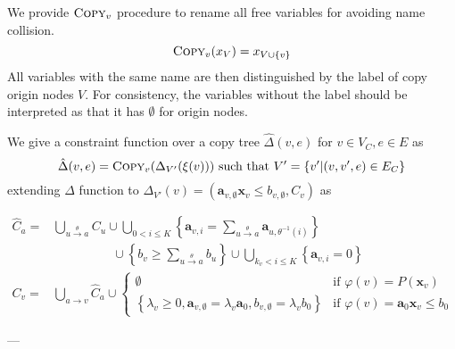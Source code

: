 \documentclass[a4paper,12pt]{article}
\newcommand{\edge}[2]{#1\rightarrow#2}
\newcommand{\edgel}[3]{#1\xrightarrow{#2}#3}
\begin{document}
We provide $\textsc{Copy}_v$ procedure to rename all free variables
for avoiding name collision.
\[ \textsc{Copy}_v (x_V) = x_{V \cup \left\lbrace v \right\rbrace} \]
All variables with the same name are then distinguished by the label
of copy origin nodes $V$. For consistency, the variables without the
label should be interpreted as that it has $\emptyset$ for origin
nodes.

We give a constraint function over a copy tree
$\hat \Delta(v,e)$ for $v \in V_C, e \in E$ as
\[ \hat \Delta (v,e) = \textsc{Copy}_v (\Delta_{V'} (\xi (v)))
\text{ such that } V' = \left\lbrace v' \middle| (v, v',e) \in E_C \right\rbrace \]
extending $\Delta$ function to
$\Delta_{V'} (v) = (\mathbf{a}_{v,\emptyset} \mathbf{x}_v \leq b_{v,\emptyset}, C_v)$
as

\begin{align*}
\hat C_a = &
 \bigcup_{\edgel{u}{\theta}{a}} C_u \cup
 \bigcup_{0 < i \leq K}
 \left\lbrace
  \mathbf{a}_{v,i} = \sum_{\edgel{u}{\theta}{a}} \mathbf{a}_{u, \theta^{-1} (i)}
 \right\rbrace \\
 & \hspace{2cm} \cup
 \left\lbrace
  b_v \geq \sum_{\edgel{u}{\theta}{a}} b_u
 \right\rbrace \cup
 \bigcup_{k_v < i \leq K}
 \left\lbrace \mathbf{a}_{v,i} = 0 \right\rbrace
\\
C_v = & \bigcup_{\edge{a}{v}} \hat C_a \cup
\begin{cases}
\emptyset
& \mbox{if } \varphi(v) = P(\mathbf{x}_v) \\
\left\lbrace
 \lambda_v \geq 0, \mathbf{a}_{v,\emptyset} = \lambda_v \mathbf{a}_0,
 b_{v,\emptyset} = \lambda_v b_0
\right\rbrace
& \mbox{if } \varphi(v) = \mathbf{a}_0 \mathbf{x}_v \leq b_0
\end{cases}
\end{align*}

---
\end{document}
